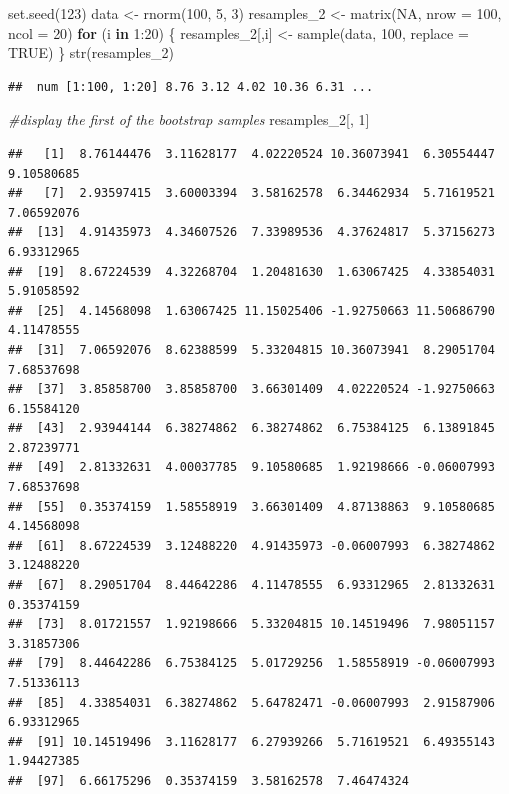 \documentclass[
]{book}
\newenvironment{Shaded}{\begin{snugshade}}{\end{snugshade}}
\newcommand{\AttributeTok}[1]{\textcolor[rgb]{0.77,0.63,0.00}{#1}}
\newcommand{\CommentTok}[1]{\textcolor[rgb]{0.56,0.35,0.01}{\textit{#1}}}
\newcommand{\ConstantTok}[1]{\textcolor[rgb]{0.00,0.00,0.00}{#1}}
\newcommand{\ControlFlowTok}[1]{\textcolor[rgb]{0.13,0.29,0.53}{\textbf{#1}}}
\newcommand{\DecValTok}[1]{\textcolor[rgb]{0.00,0.00,0.81}{#1}}
\newcommand{\FunctionTok}[1]{\textcolor[rgb]{0.00,0.00,0.00}{#1}}
\newcommand{\NormalTok}[1]{#1}
\newcommand{\OtherTok}[1]{\textcolor[rgb]{0.56,0.35,0.01}{#1}}
\newcommand{\SpecialCharTok}[1]{\textcolor[rgb]{0.00,0.00,0.00}{#1}}
\theoremstyle{definition}
\theoremstyle{definition}
\theoremstyle{definition}
\theoremstyle{definition}
\theoremstyle{remark}
\begin{document}
\begin{Shaded}
\begin{Highlighting}[]
\FunctionTok{set.seed}\NormalTok{(}\DecValTok{123}\NormalTok{)}
\NormalTok{data }\OtherTok{\textless{}{-}} \FunctionTok{rnorm}\NormalTok{(}\DecValTok{100}\NormalTok{, }\DecValTok{5}\NormalTok{, }\DecValTok{3}\NormalTok{)}
\NormalTok{resamples\_2 }\OtherTok{\textless{}{-}} \FunctionTok{matrix}\NormalTok{(}\ConstantTok{NA}\NormalTok{, }\AttributeTok{nrow =} \DecValTok{100}\NormalTok{, }\AttributeTok{ncol =} \DecValTok{20}\NormalTok{)}
\ControlFlowTok{for}\NormalTok{ (i }\ControlFlowTok{in} \DecValTok{1}\SpecialCharTok{:}\DecValTok{20}\NormalTok{) \{}
\NormalTok{  resamples\_2[,i] }\OtherTok{\textless{}{-}} \FunctionTok{sample}\NormalTok{(data, }\DecValTok{100}\NormalTok{, }\AttributeTok{replace =} \ConstantTok{TRUE}\NormalTok{)}
\NormalTok{\}}
\FunctionTok{str}\NormalTok{(resamples\_2)}
\end{Highlighting}
\end{Shaded}

\begin{verbatim}
##  num [1:100, 1:20] 8.76 3.12 4.02 10.36 6.31 ...
\end{verbatim}

\begin{Shaded}
\begin{Highlighting}[]
\CommentTok{\#display the first of the bootstrap samples}
\NormalTok{resamples\_2[, }\DecValTok{1}\NormalTok{]}
\end{Highlighting}
\end{Shaded}

\begin{verbatim}
##   [1]  8.76144476  3.11628177  4.02220524 10.36073941  6.30554447  9.10580685
##   [7]  2.93597415  3.60003394  3.58162578  6.34462934  5.71619521  7.06592076
##  [13]  4.91435973  4.34607526  7.33989536  4.37624817  5.37156273  6.93312965
##  [19]  8.67224539  4.32268704  1.20481630  1.63067425  4.33854031  5.91058592
##  [25]  4.14568098  1.63067425 11.15025406 -1.92750663 11.50686790  4.11478555
##  [31]  7.06592076  8.62388599  5.33204815 10.36073941  8.29051704  7.68537698
##  [37]  3.85858700  3.85858700  3.66301409  4.02220524 -1.92750663  6.15584120
##  [43]  2.93944144  6.38274862  6.38274862  6.75384125  6.13891845  2.87239771
##  [49]  2.81332631  4.00037785  9.10580685  1.92198666 -0.06007993  7.68537698
##  [55]  0.35374159  1.58558919  3.66301409  4.87138863  9.10580685  4.14568098
##  [61]  8.67224539  3.12488220  4.91435973 -0.06007993  6.38274862  3.12488220
##  [67]  8.29051704  8.44642286  4.11478555  6.93312965  2.81332631  0.35374159
##  [73]  8.01721557  1.92198666  5.33204815 10.14519496  7.98051157  3.31857306
##  [79]  8.44642286  6.75384125  5.01729256  1.58558919 -0.06007993  7.51336113
##  [85]  4.33854031  6.38274862  5.64782471 -0.06007993  2.91587906  6.93312965
##  [91] 10.14519496  3.11628177  6.27939266  5.71619521  6.49355143  1.94427385
##  [97]  6.66175296  0.35374159  3.58162578  7.46474324
\end{verbatim}
\end{document}
